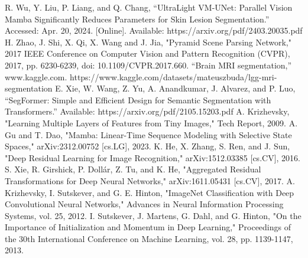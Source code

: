 \documentclass[conference]{IEEEtran}
\begin{document}
\begin{thebibliography}{00}
     R. Wu, Y. Liu, P. Liang, and Q. Chang, “UltraLight VM-UNet: Parallel Vision Mamba Significantly Reduces Parameters for Skin Lesion Segmentation.” Accessed: Apr. 20, 2024. [Online]. Available: https://arxiv.org/pdf/2403.20035.pdf
    H. Zhao, J. Shi, X. Qi, X. Wang and J. Jia, "Pyramid Scene Parsing Network," 2017 IEEE Conference on Computer Vision and Pattern Recognition (CVPR), 2017, pp. 6230-6239, doi: 10.1109/CVPR.2017.660.
     “Brain MRI segmentation,” www.kaggle.com. https://www.kaggle.com/datasets/mateuszbuda/lgg-mri-segmentation
     E. Xie, W. Wang, Z. Yu, A. Anandkumar, J. Alvarez, and P. Luo, “SegFormer: Simple and Efficient Design for Semantic Segmentation with Transformers.” Available: https://arxiv.org/pdf/2105.15203.pdf
     A. Krizhevsky, "Learning Multiple Layers of Features from Tiny Images," Tech Report, 2009.
     A. Gu and T. Dao, "Mamba: Linear-Time Sequence Modeling with Selective State Spaces," arXiv:2312.00752 [cs.LG], 2023.
     K. He, X. Zhang, S. Ren, and J. Sun, "Deep Residual Learning for Image Recognition," arXiv:1512.03385 [cs.CV], 2016.
     S. Xie, R. Girshick, P. Dollár, Z. Tu, and K. He, "Aggregated Residual Transformations for Deep Neural Networks," arXiv:1611.05431 [cs.CV], 2017.
     A. Krizhevsky, I. Sutskever, and G. E. Hinton, "ImageNet Classification with Deep Convolutional Neural Networks," Advances in Neural Information Processing Systems, vol. 25, 2012.
     I. Sutskever, J. Martens, G. Dahl, and G. Hinton, "On the Importance of Initialization and Momentum in Deep Learning," Proceedings of the 30th International Conference on Machine Learning, vol. 28, pp. 1139-1147, 2013.
\end{thebibliography}
\end{document}
